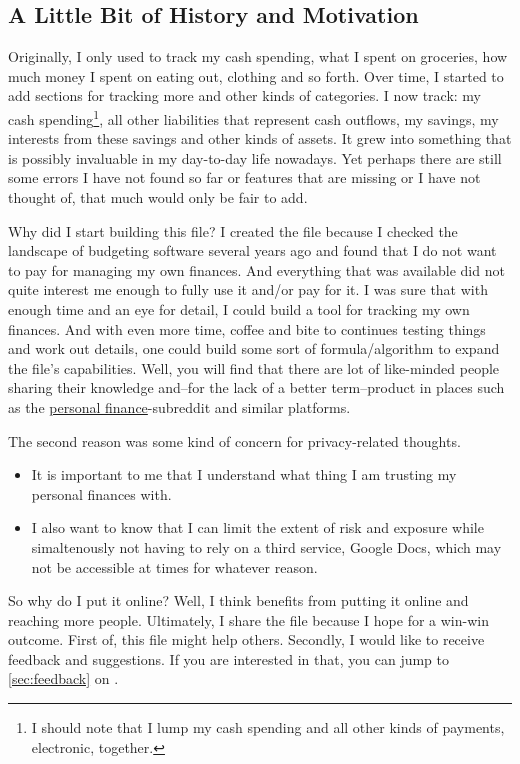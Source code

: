 \subsection{A Little Bit of History and Motivation}
\label{subsec:motivation-history}

Originally, I only used \tfn to track my cash spending, \ie what I spent on groceries, how much money I spent on eating out, clothing and so forth.
Over time, I started to add sections for tracking more and other kinds of categories.
I now track: my cash spending\footnote{I should note that I lump my cash spending and all other kinds of payments, \eg electronic, together.}, all other liabilities that represent cash outflows, my savings, my interests from these savings and other kinds of assets.
It grew into something that is possibly invaluable in my day-to-day life nowadays.
Yet perhaps there are still some errors I have not found so far or features that are missing or I have not thought of, that much would only be fair to add.

Why did I start building this file? I created the file because I checked the landscape of budgeting software several years ago and found that I do not want to pay for managing my own finances.
And everything that was available did not quite interest me enough to fully use it and/or pay for it.
I was sure that with enough time and an eye for detail, I could build a tool for tracking my own finances.
And with even more time, coffee and bite to continues testing things and work out details, one could build some sort of formula/algorithm to expand the file's capabilities.
Well, you will find that there are lot of like-minded people sharing their knowledge and--for the lack of a better term--product in places such as the \href{https://reddit.com/r/personalfinance}{personal finance}-subreddit and similar platforms.

The second reason was some kind of concern for privacy-related thoughts.
\begin{itemize}
	\item It is important to me that I understand what thing I am trusting my personal finances with.
	\item I also want to know that I can limit the extent of risk and exposure while simaltenously not having to rely on a third service, \eg Google Docs, which may not be accessible at times for whatever reason.
\end{itemize}

So why do I put it online? 
Well, I think \tfn benefits from putting it online and reaching more people.
Ultimately, I share the file because I hope for a win-win outcome.
First of, this file might help others.
Secondly, I would like to receive feedback and suggestions.
If you are interested in that, you can jump to \autoref{sec:feedback} on .

